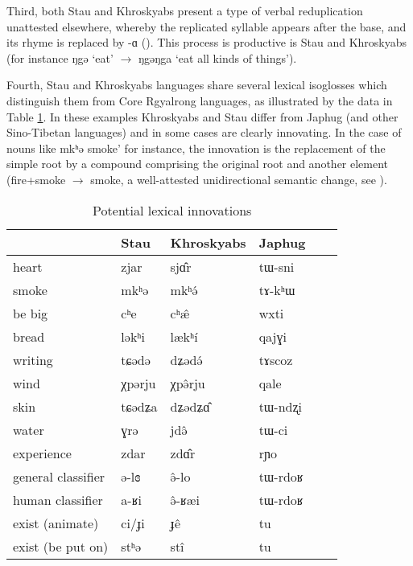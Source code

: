 \documentclass[oneside,a4paper,11pt]{article}
\newcommand{\ipa}[1]{{\phon #1}} %
\begin{document}
Third, both Stau and Khroskyabs present a type of verbal reduplication unattested elsewhere, whereby the replicated syllable appears after the base, and its rhyme is replaced by \ipa{-ɑ} (\citealt{lai13fuyin}). This process is productive is Stau and Khroskyabs (for instance \ipa{ŋgə} `eat' $\rightarrow$ \ipa{ŋgəŋga} `eat all kinds of things').
 
 
 Fourth, Stau and Khroskyabs languages share several lexical isoglosses which distinguish them from Core Rgyalrong languages, as illustrated by the data in Table \ref{tab:lexicon}. In  these examples Khroskyabs and Stau differ from Japhug (and other Sino-Tibetan languages) and in some cases are clearly innovating. In the case of nouns like \ipa{mkʰə}  smoke' for instance, the innovation is the replacement of the simple root by a compound comprising the original root and another element (fire+smoke $\rightarrow$ smoke, a well-attested unidirectional semantic change, see \citealt{urban11semantic}). 
 
  \begin{table}[h]
  \caption{Potential lexical innovations} \label{tab:lexicon} \centering
 \begin{tabular}{llllll}
 \toprule
 &	Stau &	Khroskyabs &	Japhug &	\\	
  \midrule
heart &	\ipa{zjar}  &	\ipa{sjɑ̂r} &	\ipa{tɯ-sni} &	\\	
smoke  &	\ipa{mkʰə} &	\ipa{mkʰə́} &	\ipa{tɤ-kʰɯ} &	\\	
be big  &	\ipa{cʰe} &	\ipa{cʰæ̂} &	\ipa{wxti} &	\\	
bread  &	\ipa{ləkʰi} &	\ipa{lækʰí} &	\ipa{qajɣi} &	\\	
writing  &	\ipa{tɕədə} &	\ipa{dʑədə́} &	\ipa{tɤscoz} &	\\	
wind  &	\ipa{χpərju} &	\ipa{χpə̂rju    } &	\ipa{qale} &	\\	
skin  &	\ipa{tɕədʑa} &	\ipa{dʑədʑɑ̂} &	\ipa{tɯ-ndʐi} &	\\	
water  &	\ipa{ɣrə} &	\ipa{jdə̂} &	\ipa{tɯ-ci} &	\\
experience  &	\ipa{zdar} &	\ipa{zdɑ̂r} &	\ipa{rɲo} &	\\	
  \midrule
general classifier  &	\ipa{ə-lɞ} &	\ipa{ə̂-lo} &	\ipa{tɯ-rdoʁ} &	\\	
human classifier  &	\ipa{a-ʁi} &	\ipa{ə̂-ʁæi} &	\ipa{tɯ-rdoʁ} &	\\	
  \midrule
exist (animate)  &	\ipa{ci/ɟi} &	\ipa{ɟê} &	\ipa{tu} &	\\	
exist (be put on)  &	\ipa{stʰə} &	\ipa{stî} &	\ipa{tu} &	\\	
\bottomrule
\end{tabular}
\end{table}
\end{document}
